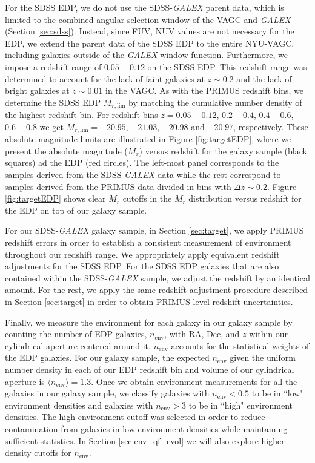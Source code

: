 \documentclass{emulateapj}
\begin{document}
For the SDSS EDP, we do not use the SDSS-{\em GALEX} parent data,
which is limited to the combined angular selection window of the
VAGC and {\em GALEX} (Section \ref{sec:sdss}). Instead, since FUV, NUV
values are not necessary for the EDP, we extend the parent data of the
SDSS EDP to the entire NYU-VAGC, including galaxies outside of the
{\em GALEX} window function. Furthermore, we impose a redshift range
of $0.05-0.12$ on the SDSS EDP. This redshift range was determined to
account for the lack of faint galaxies at $z \sim 0.2$ and the lack of
bright galaxies at $z \sim 0.01$ in the VAGC. As with the PRIMUS
redshift bins, we determine the SDSS EDP $M_{r, \mathrm{lim}}$ by matching
the cumulative number density of the highest redshift bin. For
redshift bins $z = 0.05-0.12$, $0.2-0.4$, $0.4-0.6$, $0.6-0.8$ we get
$M_{r,\mathrm{lim}} = -20.95$, $-21.03$, $-20.98$ and $-20.97$,
respectively. These absolute magnitude limits are illustrated in
Figure \ref{fig:targetEDP}, where we present the absolute magnitude ($M_{r}$) versus redshift for the galaxy sample (black squares) ad the EDP (red circles). 
The left-most panel corresponds to the samples derived from the SDSS-{\em GALEX} data while the rest correspond to samples derived from the PRIMUS data divided in bins with $\Delta z \sim 0.2$. 
Figure \ref{fig:targetEDP} shows clear $M_r$ cutoffs in the
$M_{r}$ distribution versus redshift for the EDP on top
of our galaxy sample.

For our SDSS-{\em GALEX} galaxy sample, in Section \ref{sec:target}, we apply PRIMUS redshift errors in order to establish a consistent measurement of environment throughout our redshift range. We appropriately apply equivalent redshift adjustments for the SDSS EDP. For the SDSS EDP galaxies that are also contained within the SDSS-{\em GALEX} sample, we adjust the redshift by an identical amount. For the rest, we apply the same redshift adjustment procedure described in Section \ref{sec:target} in order to obtain PRIMUS level redshift uncertainties. 

Finally, we measure the environment for each galaxy in our galaxy
sample by counting the number of EDP galaxies, $n_{\mathrm{env}}$, with RA,
Dec, and $z$ within our cylindrical aperture centered around
it. $n_{\mathrm{env}}$ accounts for the statistical weights of the EDP
galaxies. 
For our galaxy sample, the expected $n_{\mathrm{env}}$ given the uniform number density in 
each of our EDP redshift bin and volume of our cylindrical aperture is $\langle n_{\mathrm{env}} \rangle = 1.3$. 
Once we obtain environment measurements for all the galaxies
in our galaxy sample, we classify galaxies with $n_{\mathrm{env}} < 0.5$
to be in ``low" environment densities and galaxies with $n_{\mathrm{env}} > 3$
to be in ``high" environment densities. The high environment cutoff was
selected in order to reduce contamination from galaxies in low
environment densities while maintaining sufficient statistics. In
Section \ref{sec:env_qf_evol} we will also explore higher density
cutoffs for $n_{\mathrm{env}}$.
\end{document}
